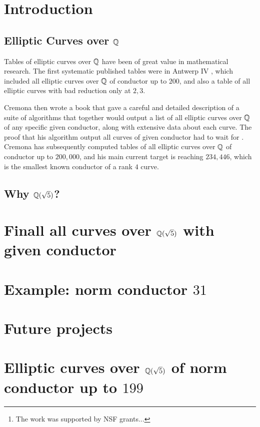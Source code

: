 \documentclass{article}
\title{}
\author{William Stein\footnote{The work was supported by NSF grants...}}
\begin{document}
\maketitle

\begin{abstract} 
\end{abstract}

\section{Introduction}\label{sec:intro}

\subsection{Elliptic Curves over $\mathbb{Q}$}
Tables of elliptic curves over $\mathbb{Q}$ have been of great value in
mathematical research.  The first systematic published tables were in
Antwerp IV \cite{antwerpiv}, which included all elliptic curves over
$\mathbb{Q}$ of conductor up to $200$, and also a table of all elliptic curves
with bad reduction only at $2,3$.

Cremona then wrote a book \cite{cremona:algs} that gave a careful and
detailed description of a suite of algorithms that together would
output a list of all elliptic curves over $\mathbb{Q}$ of any specific given
conductor, along with extensive data about each curve.  The proof that
his algorithm output all curves of given conductor had to wait for
\cite{breuil-conrad-diamond-taylor}.  Cremona has subsequently
computed tables \cite{cremona:onlinetables} of all elliptic curves
over $\mathbb{Q}$ of conductor up to $200,000$, and his main current target is
reaching $234,446$, which is the smallest known conductor of a rank
$4$ curve.
 
\subsection{Why $\mathbb{Q}(\sqrt{5})$?}

\section{Finall all curves over $\mathbb{Q}(\sqrt{5})$ with given conductor}

\section{Example: norm conductor $31$}

\section{Future projects}

\section{Elliptic curves over $\mathbb{Q}(\sqrt{5})$ of norm conductor up to $199$}



\end{document}
